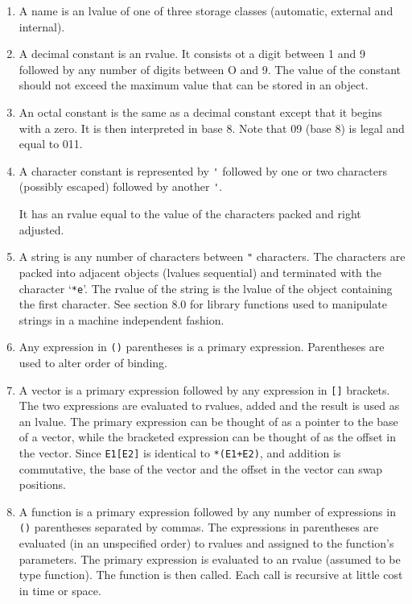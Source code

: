 \documentclass[12pt]{report}
\begin{document}
\begin{enumerate}
\item A name is an lvalue of one of three storage classes (automatic,
  external and internal).
\item A decimal constant is an rvalue.  It consists ot a digit
  between 1 and 9 followed by any number of digits between O and 9.
  The value of the constant should not exceed the maximum value that
  can be stored in an object.
\item An octal constant is the same as a decimal constant except that
  it begins with a zero.  It is then interpreted in base 8. Note that
  09 (base 8) is legal and equal to 011.
\item A character constant is represented by \verb|'| followed by one
  or two characters (possibly escaped) followed by another \verb|'|.

  It has an rvalue equal to the value of the characters packed and
  right adjusted.
\item A string is any number of characters between \verb|"|
  characters.  The characters are packed into adjacent objects
  (lvalues sequential) and terminated with the character ‘\verb|*e|’.
  The rvalue of the string is the lvalue of the object containing the
  first character.  See section 8.0 for library functions used to
  manipulate strings in a machine independent fashion.
\item Any expression in \verb|()| parentheses is a primary expression.
  Parentheses are used to alter order of binding.
\item A vector is a primary expression followed by any expression in
  \verb|[]| brackets.  The two expressions are evaluated to rvalues,
  added and the result is used as an lvalue.  The primary expression
  can be thought of as a pointer to the base of a vector, while the
  bracketed expression can be thought of as the offset in the vector.
  Since \verb|E1[E2]| is identical to \verb|*(E1+E2)|, and addition is
  commutative, the base of the vector and the offset in the vector can
  swap positions.
\item A function is a primary expression followed by any number of
  expressions in \verb|()| parentheses separated by commas.  The
  expressions in parentheses are evaluated (in an unspecified order)
  to rvalues and assigned to the function's parameters.  The primary
  expression is evaluated to an rvalue (assumed to be type function).
  The function is then called. Each call is recursive at little cost
  in time or space.
\end{enumerate}
\end{document}
